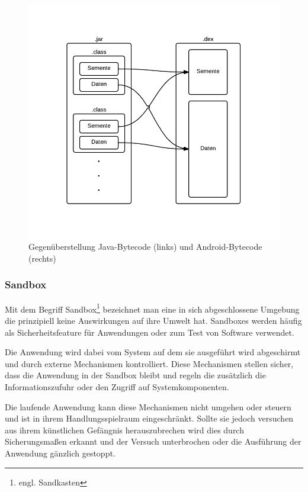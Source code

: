  \begin{figure}[ht!]
 \begin{center}
 \includegraphics[scale=0.5]{images/dexjar}
 \caption{Gegenüberstellung Java-Bytecode (links) und Android-Bytecode (rechts)}
 \label{dexjar}
 \end{center}
 \end{figure}
 
\subsubsection{Sandbox}
\label{sandbox}

Mit dem Begriff Sandbox\footnote{engl. Sandkasten} bezeichnet man eine in sich abgeschlossene Umgebung die prinzipiell keine Auswirkungen auf ihre Umwelt hat. Sandboxes werden häufig als Sicherheitsfeature für Anwendungen oder zum Test von Software verwendet.

Die Anwendung wird dabei vom System auf dem sie ausgeführt wird abgeschirmt und durch externe Mechanismen kontrolliert. Diese Mechanismen stellen sicher, dass die Anwendung in der Sandbox bleibt und regeln die zusätzlich die Informationszufuhr oder den Zugriff auf Systemkomponenten.

Die laufende Anwendung kann diese Mechanismen nicht umgehen oder steuern und ist in ihrem Handlungsspielraum eingeschränkt. Sollte sie jedoch versuchen aus ihrem künstlichen Gefängnis herauszubrechen wird dies durch Sicherungsmaßen erkannt und der Versuch unterbrochen oder die Ausführung der Anwendung gänzlich gestoppt.

